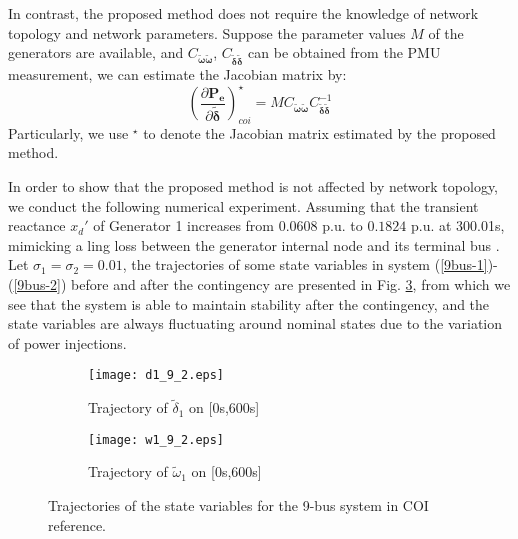 \documentclass[journal]{IEEEtran}
\begin{document}
In contrast, the proposed method does not require the knowledge of network topology and network parameters. Suppose the parameter values $M$ of the generators are available, and $C_{\bm{\tilde{\omega}}{\bm{\tilde{\omega}}}}$, $C_{\bm{\tilde{\delta}}{\bm{\tilde{\delta}}}}$ can be obtained from the PMU measurement, we can estimate the Jacobian matrix by: \begin{equation}
(\frac{\partial\bm{P_e}}{\partial\bm{\tilde{\delta}}})_{coi}^{\star}=MC_{\bm{\tilde{\omega}}{\bm{\tilde{\omega}}}}C^{-1}_{\bm{\tilde{\delta}}{\bm{\tilde{\delta}}}}\label{proposemethod}
\end{equation}
Particularly, we use $^\star$ to denote the Jacobian matrix estimated by the proposed method.

In order to show that the proposed method is not affected by network topology, we conduct the following numerical experiment. Assuming that the transient reactance $x_d'$ of Generator 1 increases from $0.0608$ p.u. to $0.1824$ p.u. at 300.01s, mimicking a ling loss between the generator internal node and its terminal bus \cite{Pai:2012}. Let $\sigma_1=\sigma_2=0.01$, the trajectories of some state variables in system (\ref{9bus-1})-(\ref{9bus-2})
before and after the contingency are presented in Fig. \ref{9bus}, from which we see that the system is able to maintain stability after the contingency, and the state variables are always fluctuating around nominal states due to the variation of power injections.
\begin{figure}[!ht]
\centering
\begin{subfigure}[t]{0.52\linewidth}
\texttt{[image: d1\_9\_2.eps]}
\caption{Trajectory of $\tilde{\delta}_1$ on [0s,600s]}\label{d1-9}
\end{subfigure}\begin{subfigure}[t]{0.5\linewidth}
\texttt{[image: w1\_9\_2.eps]}
\caption{Trajectory of $\tilde{\omega}_1$ on [0s,600s]}\label{w1-9}
\end{subfigure}
\caption{Trajectories of the state variables for the 9-bus system in COI reference.}\label{9bus}
\end{figure}
\end{document}
